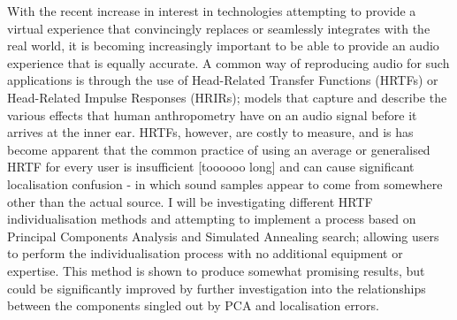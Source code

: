 With the recent increase in interest in technologies attempting to provide a virtual experience that convincingly replaces or seamlessly integrates with the real world, it is becoming increasingly important to be able to provide an audio experience that is equally accurate. A common way of reproducing audio for such applications is through the use of Head-Related Transfer Functions (HRTFs) or Head-Related Impulse Responses (HRIRs); models that capture and describe the various effects that human anthropometry have on an audio signal before it arrives at the inner ear. HRTFs, however, are costly to measure, and is has become apparent that the common practice of using an average or generalised HRTF for every user is insufficient [toooooo long] and can cause significant localisation confusion - in which sound samples appear to come from somewhere other than the actual source. I will be investigating different HRTF individualisation methods and attempting to implement a process based on Principal Components Analysis and Simulated Annealing search; allowing users to perform the individualisation process with no additional equipment or expertise. This method is shown to produce somewhat promising results, but could be significantly improved by further investigation into the relationships between the components singled out by PCA and localisation errors. 